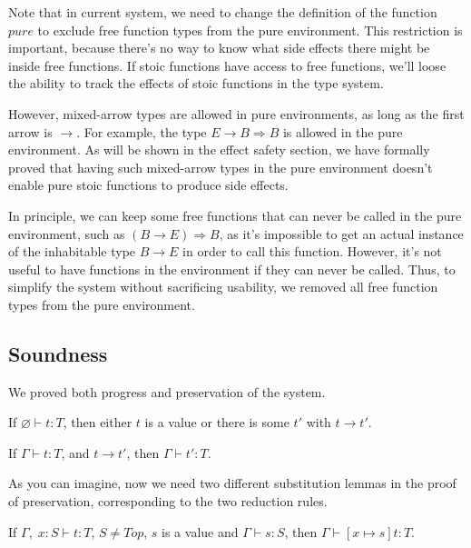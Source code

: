 Note that in current system, we need to change the definition of the
function $pure$ to exclude free function types from the pure
environment. This restriction is important, because there's no way to
know what side effects there might be inside free functions. If stoic
functions have access to free functions, we'll loose the ability to
track the effects of stoic functions in the type system.

However, mixed-arrow types are allowed in pure environments, as long
as the first arrow is $\to$. For example, the type
$E \to B \Rightarrow B$ is allowed in the pure environment. As will be
shown in the effect safety section, we have formally proved that
having such mixed-arrow types in the pure environment doesn't enable
pure stoic functions to produce side effects.

In principle, we can keep some free functions that can never be called
in the pure environment, such as $(B \to E) \Rightarrow B$, as it's
impossible to get an actual instance of the inhabitable type $B \to E$
in order to call this function. However, it's not useful to have
functions in the environment if they can never be called. Thus, to
simplify the system without sacrificing usability, we removed all free
function types from the pure environment.

\subsection{Soundness}

We proved both progress and preservation of the system.

\begin{theorem}[Progress]
If $\varnothing \vdash t : T$, then either $t$ is a value or there is some
$t'$ with $t \longrightarrow t'$.
\end{theorem}

\begin{theorem}[Preservation]
If $\Gamma \vdash t : T$, and $t \longrightarrow t'$, then $\Gamma
\vdash t' : T$.
\end{theorem}

As you can imagine, now we need two different substitution lemmas in
the proof of preservation, corresponding to the two reduction rules.

\begin{lemma}
  If $\Gamma,\; x:S \vdash t : T$, $S \neq Top$, $s$ is a value and
  $\Gamma \vdash s : S$, then $\Gamma \vdash [x \mapsto s]t : T$.
\end{lemma}

